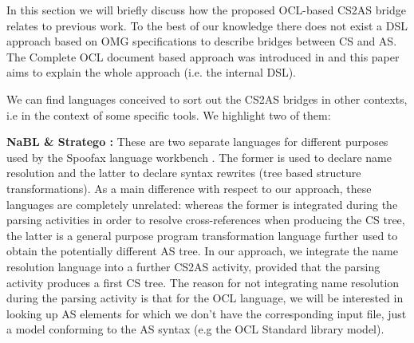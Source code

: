 \documentclass{llncs}
\begin{document}
In this section we will briefly discuss how the proposed OCL-based CS2AS bridge relates to previous work. To the best of our knowledge there does not exist a DSL approach based on OMG specifications to describe bridges between CS and AS. The Complete OCL document based approach was introduced in \cite{sanchez2014enhancingXtext} and this paper aims to explain the whole approach (i.e. the internal DSL).

We can find languages conceived to sort out the CS2AS bridges in other contexts, i.e in the context of some specific tools. %
We highlight two of them:

\textbf{NaBL \cite{konat2013decNameRes} \& Stratego \cite{visser2004stratego}:} These are two separate languages for different purposes used by the Spoofax language workbench \cite{spoofaxOnline}. The former is used to declare name resolution and the latter to declare syntax rewrites (tree based structure transformations). As a main difference with respect to our approach, these languages are completely unrelated: whereas the former is integrated during the parsing activities in order to resolve cross-references when producing the CS tree, the latter is a general purpose program transformation language further used to obtain the potentially different AS tree. In our approach, we integrate the name resolution language into a further CS2AS activity, provided that the parsing activity produces a first CS tree. The reason for not integrating name resolution during the parsing activity is that for the OCL language, we will be interested in looking up AS elements for which we don't have the corresponding input file, just a model conforming to the AS syntax (e.g the OCL Standard library model).
\end{document}
